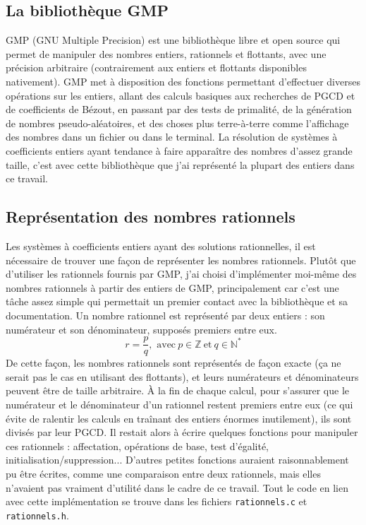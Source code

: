 \documentclass[french]{article}
\begin{document}
\subsection{La bibliothèque GMP}
GMP (GNU Multiple Precision) est une bibliothèque libre et open source qui permet de manipuler des nombres entiers, rationnels et flottants, avec une précision arbitraire (contrairement aux entiers et flottants disponibles nativement). GMP met à disposition des fonctions permettant d'effectuer diverses opérations sur les entiers, allant des calculs basiques aux recherches de PGCD et de coefficients de Bézout, en passant par des tests de primalité, de la génération de nombres pseudo-aléatoires, et des choses plus terre-à-terre comme l'affichage des nombres dans un fichier ou dans le terminal. La résolution de systèmes à coefficients entiers ayant tendance à faire apparaître des nombres d'assez grande taille, c'est avec cette bibliothèque que j'ai représenté la plupart des entiers dans ce travail.
\subsection{Représentation des nombres rationnels}
Les systèmes à coefficients entiers ayant des solutions rationnelles, il est nécessaire de trouver une façon de représenter les nombres rationnels. Plutôt que d'utiliser les rationnels fournis par GMP, j'ai choisi d'implémenter moi-même des nombres rationnels à partir des entiers de GMP, principalement car c'est une tâche assez simple qui permettait un premier contact avec la bibliothèque et sa documentation.
Un nombre rationnel est représenté par deux entiers : son numérateur et son dénominateur, supposés premiers entre eux. 
$$r = \frac{p}{q}, \mbox{ avec} \ p \in \mathbb{Z}\ \mbox{et} \ q \in \mathbb{N}^*$$
De cette façon, les nombres rationnels sont représentés de façon exacte (ça ne serait pas le cas en utilisant des flottants), et leurs numérateurs et dénominateurs peuvent être de taille arbitraire.
À la fin de chaque calcul, pour s'assurer que le numérateur et le dénominateur d'un rationnel restent premiers entre eux (ce qui évite de ralentir les calculs en traînant des entiers énormes inutilement), ils sont divisés par leur PGCD.
Il restait alors à écrire quelques fonctions pour manipuler ces rationnels : affectation, opérations de base, test d'égalité, initialisation/suppression... D'autres petites fonctions auraient raisonnablement pu être écrites, comme une comparaison entre deux rationnels, mais elles n'avaient pas vraiment d'utilité dans le cadre de ce travail.
Tout le code en lien avec cette implémentation se trouve dans les fichiers {\tt rationnels.c} et {\tt rationnels.h}.
\end{document}
